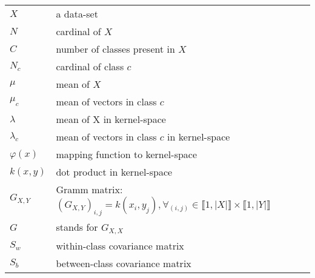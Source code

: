 
\begin{tabular}{ll}
$X$ & a data-set \\
$N$ & cardinal of $X$ \\
$C$ & number of classes present in $X$ \\
$N_c$ & cardinal of class $c$ \\
$\mu$ & mean of $X$ \\
$\mu_c$ & mean of vectors in class $c$ \\
$\lambda$ & mean of X in kernel-space \\
$\lambda_c$ & mean of vectors in class $c$ in kernel-space \\
$\varphi(x)$ & mapping function to kernel-space \\
$k(x, y)$ & dot product in kernel-space \\
$G_{X,Y}$ & Gramm matrix: ${(G_{X,Y})}_{i,j} = k(x_i, y_j), \forall_{(i, j)} \in \llbracket 1, |X|\rrbracket \times \llbracket 1, |Y|\rrbracket $\\
$G$ & stands for ${G_{X,X}}$\\
$S_w$ & within-class covariance matrix \\
$S_b$ & between-class covariance matrix
\end{tabular}
